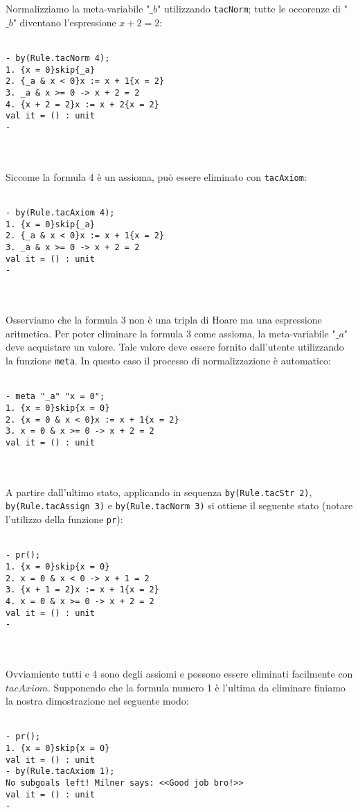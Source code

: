 \documentclass[]{article}
\begin{document}
\\
\\
Normalizziamo la meta-variabile "$\_b$" utilizzando \texttt{tacNorm}; tutte le occorenze di "$\_b$" diventano l'espressione $x + 2 = 2$:
\\
\\
\begin{BVerbatim}
- by(Rule.tacNorm 4);
1. {x = 0}skip{_a}
2. {_a & x < 0}x := x + 1{x = 2}
3. _a & x >= 0 -> x + 2 = 2
4. {x + 2 = 2}x := x + 2{x = 2}
val it = () : unit
-
\end{BVerbatim}
\\
\\
Siccome la formula 4 \`e un assioma, pu\`o essere eliminato con \texttt{tacAxiom}:
\\
\\
\begin{BVerbatim}
- by(Rule.tacAxiom 4);
1. {x = 0}skip{_a}
2. {_a & x < 0}x := x + 1{x = 2}
3. _a & x >= 0 -> x + 2 = 2
val it = () : unit
-
\end{BVerbatim}
\\
\\
Osserviamo che la formula 3 non \`e una tripla di Hoare ma una espressione aritmetica. Per poter eliminare la formula 3 come assioma, la meta-variabile "$\_a$" deve acquistare un valore. Tale valore deve essere fornito dall'utente utilizzando la funzione \texttt{meta}. In questo caso il processo di normalizzazione \`e automatico:
\\
\\
\begin{BVerbatim}
- meta "_a" "x = 0";
1. {x = 0}skip{x = 0}
2. {x = 0 & x < 0}x := x + 1{x = 2}
3. x = 0 & x >= 0 -> x + 2 = 2
val it = () : unit
\end{BVerbatim}
\\
\\
A partire dall'ultimo stato, applicando in sequenza \texttt{by(Rule.tacStr 2)}, \texttt{by(Rule.tacAssign 3)} e \texttt{by(Rule.tacNorm 3)} si ottiene il seguente stato (notare l'utilizzo della funzione \texttt{pr}):
\\
\\
\begin{BVerbatim}
- pr();
1. {x = 0}skip{x = 0}
2. x = 0 & x < 0 -> x + 1 = 2
3. {x + 1 = 2}x := x + 1{x = 2}
4. x = 0 & x >= 0 -> x + 2 = 2
val it = () : unit
-
\end{BVerbatim}
\\
\\
Ovviamiente tutti e 4 sono degli assiomi e possono essere eliminati facilmente con $tacAxiom$. Supponendo che la formula numero 1 \`e l'ultima da eliminare finiamo la nostra dimostrazione nel seguente modo:
\\
\\
\begin{BVerbatim}
- pr();
1. {x = 0}skip{x = 0}
val it = () : unit
- by(Rule.tacAxiom 1);
No subgoals left! Milner says: <<Good job bro!>>
val it = () : unit
-
\end{BVerbatim}
\\
\\
\end{document}
